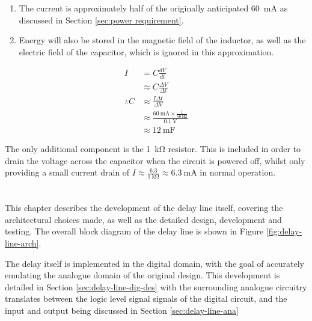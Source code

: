 \begin{enumerate}
	\item The current is approximately half of the originally anticipated \SI{60}{\milli\ampere} as discussed in Section \ref{sec:power requirement}.
	\item Energy will also be stored in the magnetic field of the inductor, as well as the electric field of the capacitor, which is ignored in this approximation.
\end{enumerate}

\begin{align}
I &= C \frac{dV}{dt} \nonumber \\
&\approx C \frac{\Delta V}{ \Delta t} \nonumber \\
\therefore C &\approx \frac{I \Delta t}{\Delta V} \nonumber \\
&\approx \frac{\SI{60}{\milli\ampere} \times \frac{1}{\SI{50}{\hertz}} }{\SI{0.1}{\volt}} \nonumber \\
&\approx \SI{12}{\milli\farad} \label{eq:delay-line-ripple}
\end{align}

The only additional component is the \SI{1}{\kilo\ohm} resistor. This is included in order to drain the voltage across the capacitor when the circuit is powered off, whilst only providing a small current drain of $I \approx \frac{6.3}{\SI{1}{\kilo\ohm}} \approx \SI{6.3}{\milli\ampere}$ in normal operation.

\chapter{} \label{sec:delay-line-des}

This chapter describes the development of the delay line itself, covering the architectural choices made, as well as the detailed design, development and testing. The overall block diagram of the delay line is shown in Figure \ref{fig:delay-line-arch}.

The delay itself is implemented in the digital domain, with the goal of accurately emulating the analogue domain of the original design. This development is detailed in Section \ref{sec:delay-line-dig-des} with the surrounding analogue circuitry translates between the logic level signal signals of the digital circuit, and the input and output being discussed in Section \ref{sec:delay-line-ana}

